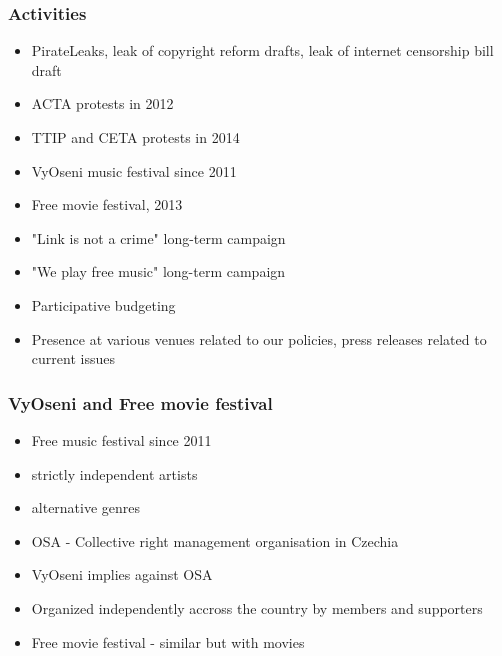\begin{frame}
	\frametitle{Activities}
	\begin{itemize}
		\item PirateLeaks, leak of copyright reform drafts, leak of internet censorship bill draft
		\item ACTA protests in 2012
		\item TTIP and CETA protests in 2014
		\item VyOseni music festival since 2011
		\item Free movie festival, 2013
		\item "Link is not a crime" long-term campaign
		\item "We play free music" long-term campaign
		\item Participative budgeting
		\item Presence at various venues related to our policies, press releases related to current issues

	\end{itemize}
\end{frame}

\begin{frame}
	\frametitle{VyOseni and Free movie festival}
	\begin{itemize}
		\item Free music festival since 2011
		\item strictly independent artists
		\item alternative genres
		\item OSA - Collective right management organisation in Czechia
		\item VyOseni implies against OSA
		\item Organized independently accross the country by members and supporters
		\item Free movie festival - similar but with movies
	\end{itemize}
\end{frame}


